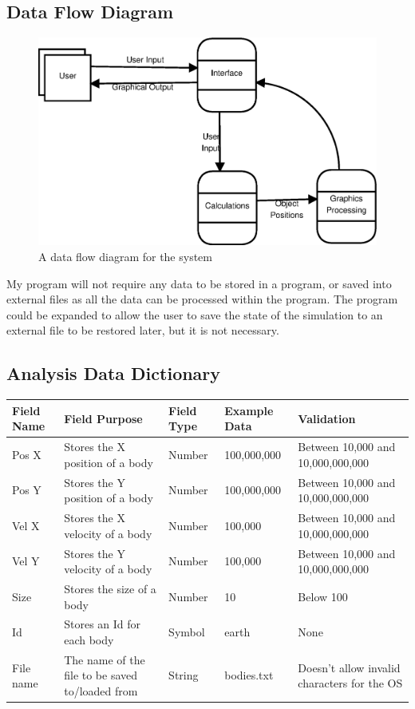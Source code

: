 \subsection{Data Flow Diagram}
\begin{figure}[H]
	\includegraphics[width=\textwidth]{./img/data-flow-diagram2.eps}
	\caption{A data flow diagram for the system}
	\label{fig:dfd}
\end{figure}
My program will not require any data to be stored in a program, or saved into
external files as all the data can be processed within the program. The program
could be expanded to allow the user to save the state of the simulation to an
external file to be restored later, but it is not necessary.

\subsection{Analysis Data Dictionary}

\begin{tabular}{p{}p{}p{}
			p{}p{}}
	Field Name & Field Purpose & Field Type & Example Data &
	Validation \\ \hline
	Pos X & Stores the X position of a body & Number & 100,000,000 & Between
	10,000 and 10,000,000,000 \\
	Pos Y & Stores the Y position of a body & Number & 100,000,000 & Between
	10,000 and 10,000,000,000 \\
	Vel X & Stores the X velocity of a body & Number & 100,000 & Between
	10,000 and 10,000,000,000 \\
	Vel Y & Stores the Y velocity of a body & Number & 100,000 & Between
	10,000 and 10,000,000,000 \\
	Size & Stores the size of a body & Number & 10 & Below 100 \\
	Id & Stores an Id for each body & Symbol & earth & None \\
	File name & The name of the file to be saved to/loaded from & String &
	bodies.txt & Doesn't allow invalid characters for the OS \\
\end{tabular}

